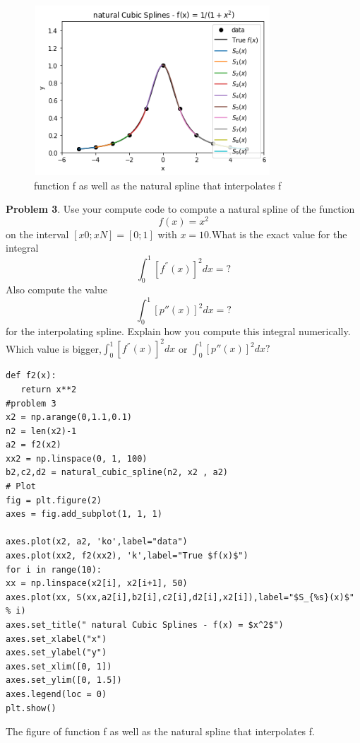 \documentclass{article}
\begin{document}
  \begin{figure}[H]            \centering\includegraphics[width=3.5in,height=2.5in]{problem2.png}
	\caption{function f as well as the natural spline that interpolates f}
	\label{fig:graph}
  \end{figure}
\noindent \textbf{Problem 3}. Use your compute code to compute a natural spline of the function
$$f(x) = x^2$$
on the interval $[x0; xN] = [0; 1]$ with $x = 10$.What is the exact value for the integral
$$ \int_0^1 [f^{''}(x)]^2 dx = ? $$
Also compute the value 
$$ \int_0^1 [p{''}(x)]^2 dx = ? $$
for the interpolating spline. Explain how you compute this integral numerically. Which
value is bigger,$ \int_0^1 [f^{''}(x)]^2 dx  $ or $ \int_0^1 [p{''}(x)]^2 dx  ?$
\begin{lstlisting}
def f2(x):
   return x**2
#problem 3
x2 = np.arange(0,1.1,0.1)
n2 = len(x2)-1
a2 = f2(x2)
xx2 = np.linspace(0, 1, 100)
b2,c2,d2 = natural_cubic_spline(n2, x2 , a2)
# Plot
fig = plt.figure(2)
axes = fig.add_subplot(1, 1, 1)

axes.plot(x2, a2, 'ko',label="data")
axes.plot(xx2, f2(xx2), 'k',label="True $f(x)$")
for i in range(10):
xx = np.linspace(x2[i], x2[i+1], 50)
axes.plot(xx, S(xx,a2[i],b2[i],c2[i],d2[i],x2[i]),label="$S_{%s}(x)$" % i)
axes.set_title(" natural Cubic Splines - f(x) = $x^2$")
axes.set_xlabel("x")
axes.set_ylabel("y")
axes.set_xlim([0, 1])
axes.set_ylim([0, 1.5])
axes.legend(loc = 0)
plt.show()
\end{lstlisting}
The figure of  function f as well as the natural spline that interpolates f.
\end{document}
